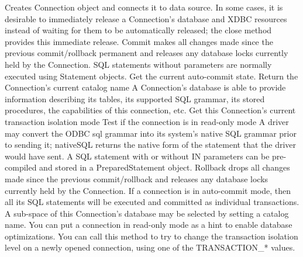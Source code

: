 \begin{description}
   Creates Connection object and connects it to data source.
     In some cases, it is desirable to immediately release a Connection's database and XDBC resources instead of waiting for
     them to be automatically released; the close method provides this immediate release.
     Commit makes all changes made since the previous commit/rollback permanent and releases any database locks
     currently held by the Connection.
     SQL statements without parameters are normally executed using Statement objects.
     Get the current auto-commit state.
     Return the Connection's current catalog name
     A Connection's database is able to provide information describing its tables, its supported SQL grammar, its stored
     procedures, the capabilities of this connection, etc.
     Get this Connection's current transaction isolation mode
     Test if the connection is in read-only mode
     A driver may convert the ODBC sql grammar into its system's native SQL grammar prior to sending it; nativeSQL returns the
     native form of the statement that the driver would have sent.
     A SQL statement with or without IN parameters can be pre-compiled and stored in a PreparedStatement object.
     Rollback drops all changes made since the previous commit/rollback and releases any database locks currently held by
     the Connection.
     If a connection is in auto-commit mode, then all its SQL statements will be executed and committed as individual
     transactions.
     A sub-space of this Connection's database may be selected by setting a catalog name.
     You can put a connection in read-only mode as a hint to enable database optimizations.
     You can call this method to try to change the transaction isolation level on a newly opened connection, using one of the
     TRANSACTION\_* values.
\end{description}


%
%
%
%
%
%
%
   

